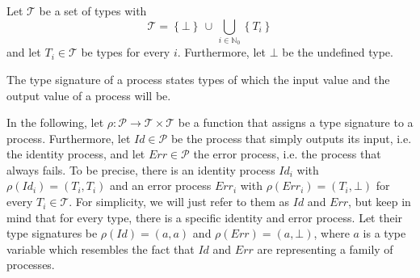 Let $\mathcal{T}$ be a set of types with
\[\mathcal{T} = \left\{ \bot \right\} \, \cup \, \bigcup_{i \in \mathbb{N}_0} \left\{ T_i \right\}\]
and let $T_i \in \mathcal{T}$ be types for every $i$. Furthermore, let $\bot$ be the undefined type.

\begin{definition}
\label{def:type_signature}
The type signature of a process states types of which the input value and the output value of a process will be.

\hfill\qedsymbol
\end{definition}

In the following, let $\rho \colon \mathcal{P} \to \mathcal{T} \times \mathcal{T}$ be a function that assigns a type signature to a process. Furthermore, let $Id \in \mathcal{P}$ be the process that simply outputs its input, i.e. the identity process, and let $Err \in \mathcal{P}$ the error process, i.e. the process that always fails. To be precise, there is an identity process $Id_i$ with $\rho \left( Id_i \right) = \left( T_i, T_i \right)$ and an error process $Err_i$ with $\rho \left( Err_i \right) = \left( T_i, \bot \right)$ for every $T_i \in \mathcal{T}$. For simplicity, we will just refer to them as $Id$ and $Err$, but keep in mind that for every type, there is a specific identity and error process. Let their type signatures be $\rho \left( Id \right) = \left( a, a \right)$ and $\rho \left( Err \right) = \left( a, \bot \right)$, where $a$ is a type variable which resembles the fact that $Id$ and $Err$ are representing a family of processes.


